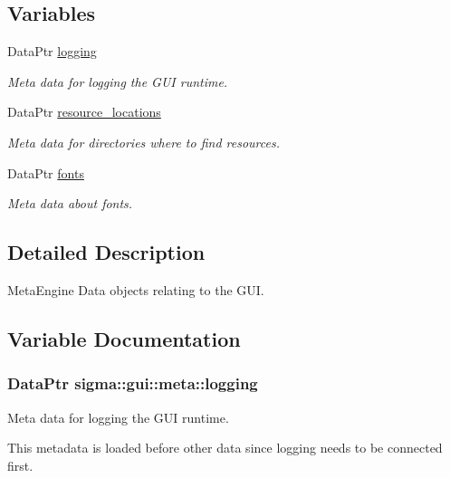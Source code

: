 \subsection*{Variables}
\begin{DoxyCompactItemize}
\item 
Data\-Ptr \hyperlink{namespacesigma_1_1gui_1_1meta_aefbe9867bf506582ce619fc6f5c2c850}{logging}
\begin{DoxyCompactList}\small\item\em Meta data for logging the G\-U\-I runtime. \end{DoxyCompactList}\item 
\hypertarget{namespacesigma_1_1gui_1_1meta_a60c386f490b02fd324c876105af40f8b}{Data\-Ptr \hyperlink{namespacesigma_1_1gui_1_1meta_a60c386f490b02fd324c876105af40f8b}{resource\-\_\-locations}}\label{namespacesigma_1_1gui_1_1meta_a60c386f490b02fd324c876105af40f8b}

\begin{DoxyCompactList}\small\item\em Meta data for directories where to find resources. \end{DoxyCompactList}\item 
\hypertarget{namespacesigma_1_1gui_1_1meta_ad04943e195bf78b1679a2fefbb812836}{Data\-Ptr \hyperlink{namespacesigma_1_1gui_1_1meta_ad04943e195bf78b1679a2fefbb812836}{fonts}}\label{namespacesigma_1_1gui_1_1meta_ad04943e195bf78b1679a2fefbb812836}

\begin{DoxyCompactList}\small\item\em Meta data about fonts. \end{DoxyCompactList}\end{DoxyCompactItemize}


\subsection{Detailed Description}
Meta\-Engine Data objects relating to the G\-U\-I. 

\subsection{Variable Documentation}
\hypertarget{namespacesigma_1_1gui_1_1meta_aefbe9867bf506582ce619fc6f5c2c850}{
\subsubsection[{logging}]{\setlength{\rightskip}{0pt plus 5cm}Data\-Ptr sigma\-::gui\-::meta\-::logging}}\label{namespacesigma_1_1gui_1_1meta_aefbe9867bf506582ce619fc6f5c2c850}


Meta data for logging the G\-U\-I runtime. 

This metadata is loaded before other data since logging needs to be connected first. 